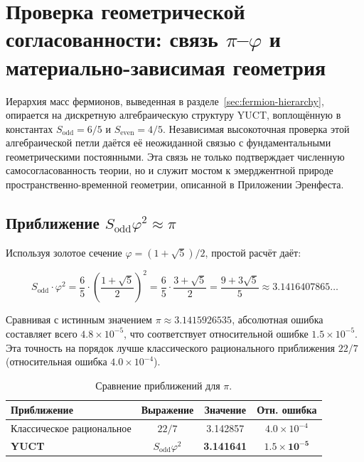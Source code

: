 \documentclass[11pt,a4paper]{article}
\theoremstyle{remark}
\begin{document}
	\section{Проверка геометрической согласованности: связь \(\pi\)–\(\varphi\) и материально-зависимая геометрия}
	\label{sec:pi-phi-consistency}
	
	Иерархия масс фермионов, выведенная в разделе~\ref{sec:fermion-hierarchy}, опирается на дискретную алгебраическую структуру YUCT, воплощённую в константах \(S_{\mathrm{odd}} = 6/5\) и \(S_{\mathrm{even}} = 4/5\). Независимая высокоточная проверка этой алгебраической петли даётся её неожиданной связью с фундаментальными геометрическими постоянными. Эта связь не только подтверждает численную самосогласованность теории, но и служит мостом к эмерджентной природе пространственно-временной геометрии, описанной в Приложении Эренфеста.
	
	\subsection{Приближение \(S_{\mathrm{odd}} \varphi^2 \approx \pi\)}
	
	Используя золотое сечение \(\varphi = (1+\sqrt{5})/2\), простой расчёт даёт:
	
	\begin{equation}
		S_{\mathrm{odd}} \cdot \varphi^2 = \frac{6}{5} \cdot \left(\frac{1+\sqrt{5}}{2}\right)^2 
		= \frac{6}{5} \cdot \frac{3+\sqrt{5}}{2} 
		= \frac{9 + 3\sqrt{5}}{5} \approx 3.1416407865\dots
	\end{equation}
	
	Сравнивая с истинным значением \(\pi \approx 3.1415926535\), абсолютная ошибка составляет всего \(4.8 \times 10^{-5}\), что соответствует относительной ошибке \(1.5 \times 10^{-5}\). Эта точность на порядок лучше классического рационального приближения \(22/7\) (относительная ошибка \(4.0 \times 10^{-4}\)).
	
	\begin{table}[htbp]
		\centering
		\caption{Сравнение приближений для \(\pi\).}
		\label{tab:pi_approx}
		\begin{tabular}{lccc}
			\toprule
			\textbf{Приближение} & \textbf{Выражение} & \textbf{Значение} & \textbf{Отн. ошибка} \\
			\midrule
			Классическое рациональное & \(22/7\) & 3.142857 & \(4.0 \times 10^{-4}\) \\
			\textbf{YUCT} & \(S_{\mathrm{odd}}\varphi^2\) & \textbf{3.141641} & \(\mathbf{1.5 \times 10^{-5}}\) \\
			\bottomrule
		\end{tabular}
	\end{table}
	
\end{document}

